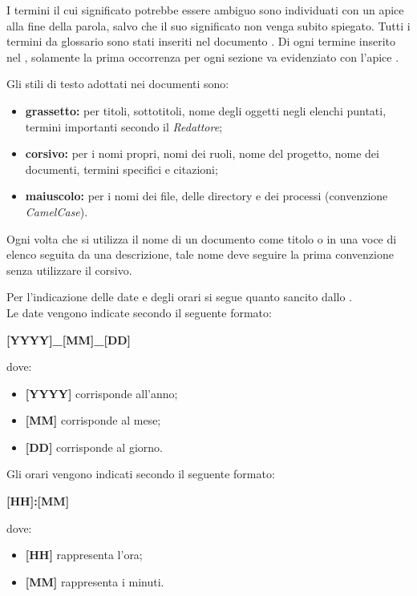 I termini il cui significato potrebbe essere ambiguo sono individuati con un apice  alla fine della parola, salvo che il suo significato non venga subito spiegato. Tutti i termini da glossario sono stati inseriti nel documento \Glossariov. Di ogni termine inserito nel \textit{\Glossario}, solamente la prima occorrenza per ogni sezione va evidenziato con l'apice .

Gli stili di testo adottati nei documenti sono:
\begin{itemize}
	\item \textbf{grassetto:} per titoli, sottotitoli, nome degli oggetti negli elenchi puntati, termini importanti secondo il \textit{Redattore};
	\item \textbf{corsivo:} per i nomi propri, nomi dei ruoli, nome del progetto, nome dei documenti, termini specifici e citazioni;
	\item \textbf{maiuscolo:} per i nomi dei file, delle directory e dei processi (convenzione \textit{CamelCase}).	
\end{itemize}
Ogni volta che si utilizza il nome di un documento come titolo o in una voce di elenco seguita da una descrizione, tale nome deve seguire la prima convenzione senza utilizzare il corsivo.

Per l'indicazione delle date e degli orari si segue quanto sancito dallo  .\\
Le date vengono indicate secondo il seguente formato:
\begin{center}
	\textbf{[YYYY]\_[MM]\_[DD]} 
\end{center}
dove:
\begin{itemize}
	\item \textbf{[YYYY]} corrisponde all'anno;
	\item \textbf{[MM]} corrisponde al mese;
	\item \textbf{[DD]} corrisponde al giorno.
\end{itemize}
Gli orari vengono indicati secondo il seguente formato:
\begin{center}
	\textbf{[HH]:[MM]} 
\end{center}
dove:
\begin{itemize}
	\item \textbf{[HH]} rappresenta l'ora;
	\item \textbf{[MM]} rappresenta i minuti.
\end{itemize}

